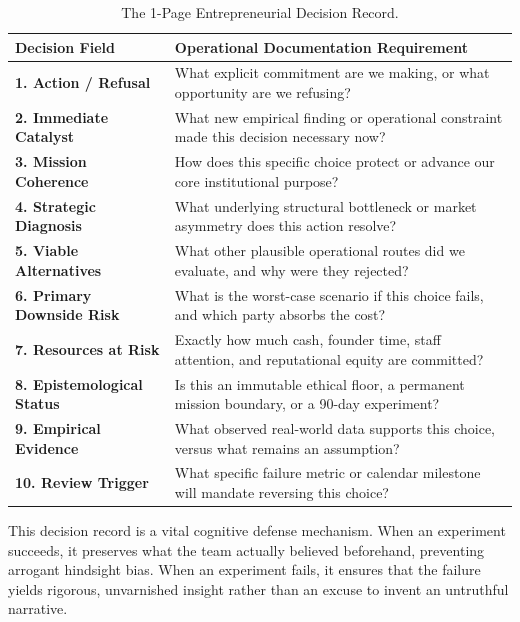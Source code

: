 \begin{table}[htbp]
\centering
\begin{tcolorbox}[
  enhanced,
  colback=white,
  colframe=BayesBorder!80!white,
  boxrule=0.4pt,
  arc=2pt,
  left=3pt,right=3pt,top=3pt,bottom=3pt,
  before skip=3pt,after skip=4pt
]
\scriptsize
\setlength{\tabcolsep}{3pt}
\renewcommand{\arraystretch}{1.18}
\begin{tabularx}{\linewidth}{@{} >{\bfseries\color{BayesInk}}p{2.3cm} >{\color{BayesInk}}X @{}}
\toprule
\textbf{Decision Field} & \textbf{Operational Documentation Requirement} \\
\midrule
1. Action / Refusal & What explicit commitment are we making, or what opportunity are we refusing? \\
\midrule
2. Immediate Catalyst & What new empirical finding or operational constraint made this decision necessary now? \\
\midrule
3. Mission Coherence & How does this specific choice protect or advance our core institutional purpose? \\
\midrule
4. Strategic Diagnosis & What underlying structural bottleneck or market asymmetry does this action resolve? \\
\midrule
5. Viable Alternatives & What other plausible operational routes did we evaluate, and why were they rejected? \\
\midrule
6. Primary Downside Risk & What is the worst-case scenario if this choice fails, and which party absorbs the cost? \\
\midrule
7. Resources at Risk & Exactly how much cash, founder time, staff attention, and reputational equity are committed? \\
\midrule
8. Epistemological Status & Is this an immutable ethical floor, a permanent mission boundary, or a 90-day experiment? \\
\midrule
9. Empirical Evidence & What observed real-world data supports this choice, versus what remains an assumption? \\
\midrule
10. Review Trigger & What specific failure metric or calendar milestone will mandate reversing this choice? \\
\bottomrule
\end{tabularx}
\end{tcolorbox}
\caption{The 1-Page Entrepreneurial Decision Record.}
\label{tab:decision-record}
\end{table}

This decision record is a vital cognitive defense mechanism. When an experiment succeeds, it preserves what the team actually believed beforehand, preventing arrogant hindsight bias. When an experiment fails, it ensures that the failure yields rigorous, unvarnished insight rather than an excuse to invent an untruthful narrative.
